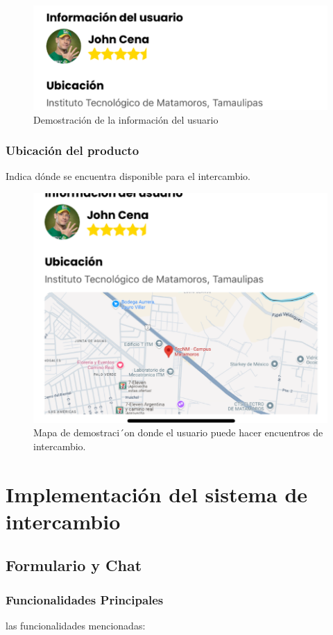 \documentclass[11pt, a4paper, oneside]{book}
\begin{document}
\begin{figure}[H]
    \centering
    \includegraphics[width=0.75
    \linewidth]{Pictures/InformacionUsuario.png  }
            \caption{ Demostración de la información del usuario}
\end{figure}

\subsection{Ubicación del producto}
Indica dónde se encuentra disponible para el intercambio.

\begin{figure}[H]
    \centering
    \includegraphics[width=0.75
    \linewidth]{Pictures/UbicacionUsuario.png  }
            \caption{ Mapa de demostraci´on donde el usuario puede hacer encuentros de intercambio.}
\end{figure}
\chapter{Implementación del sistema de intercambio}
\noindent


\section{Formulario y Chat}

\subsection{Funcionalidades Principales}
     las funcionalidades mencionadas:
     
\end{document}
